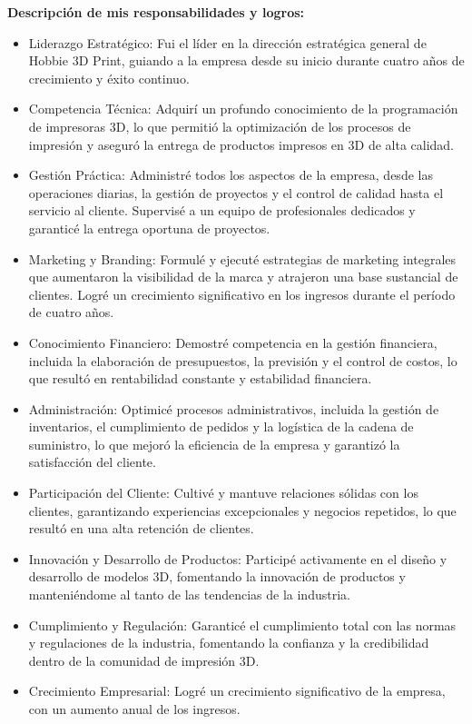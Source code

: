 \documentclass[a4paper,10pt]{article}
\begin{document}
\textbf{Descripción de mis responsabilidades y logros:}
\begin{itemize}
    \item Liderazgo Estratégico: Fui el líder en la dirección estratégica general de Hobbie 3D Print, guiando a la empresa desde su inicio durante cuatro años de crecimiento y éxito continuo.
    \item Competencia Técnica: Adquirí un profundo conocimiento de la programación de impresoras 3D, lo que permitió la optimización de los procesos de impresión y aseguró la entrega de productos impresos en 3D de alta calidad.
    \item Gestión Práctica: Administré todos los aspectos de la empresa, desde las operaciones diarias, la gestión de proyectos y el control de calidad hasta el servicio al cliente. Supervisé a un equipo de profesionales dedicados y garanticé la entrega oportuna de proyectos.
    \item Marketing y Branding: Formulé y ejecuté estrategias de marketing integrales que aumentaron la visibilidad de la marca y atrajeron una base sustancial de clientes. Logré un crecimiento significativo en los ingresos durante el período de cuatro años.
    \item Conocimiento Financiero: Demostré competencia en la gestión financiera, incluida la elaboración de presupuestos, la previsión y el control de costos, lo que resultó en rentabilidad constante y estabilidad financiera.
    \item Administración: Optimicé procesos administrativos, incluida la gestión de inventarios, el cumplimiento de pedidos y la logística de la cadena de suministro, lo que mejoró la eficiencia de la empresa y garantizó la satisfacción del cliente.
    \item Participación del Cliente: Cultivé y mantuve relaciones sólidas con los clientes, garantizando experiencias excepcionales y negocios repetidos, lo que resultó en una alta retención de clientes.
    \item Innovación y Desarrollo de Productos: Participé activamente en el diseño y desarrollo de modelos 3D, fomentando la innovación de productos y manteniéndome al tanto de las tendencias de la industria.
    \item Cumplimiento y Regulación: Garanticé el cumplimiento total con las normas y regulaciones de la industria, fomentando la confianza y la credibilidad dentro de la comunidad de impresión 3D.
    \item Crecimiento Empresarial: Logré un crecimiento significativo de la empresa, con un aumento anual de los ingresos.

\end{itemize}
\end{document}
